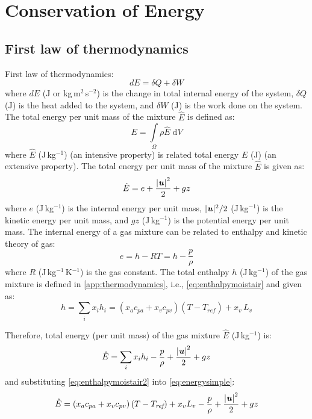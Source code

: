 \newpage
\section{Conservation of Energy}
\label{sec:conservationofenergy}

\subsection{First law of thermodynamics}

First law of thermodynamics:
\begin{equation}
dE = \delta Q + \delta W
\end{equation}
where $dE$ (J or kg\,m$^2$\,s$^{-2}$) is the change in total internal energy of the system, $\delta Q$ (J) is the heat added to the system, and $\delta W$ (J) is the work done on the system. The total energy per unit mass of the mixture $\hat{E}$ is defined as:
\begin{equation}
E = \int\limits_\Omega \rho \hat{E}\;\mathrm{d}V
\end{equation}
where $\hat{E}$ (J\,kg$^{-1}$) (an intensive property) is related total energy $E$ (J) (an extensive property). The total energy per unit mass of the mixture $\hat{E}$ is given as: 
\begin{equation}
\hat{E} = e + \frac{\left| \textbf{\textit{u}} \right|^2}{2} + gz
\end{equation}
where $e$ (J\,kg$^{-1}$) is the internal energy per unit mass, $|\textbf{\textit{u}}|^2/2$ (J\,kg$^{-1}$) is the kinetic energy per unit mass, and $gz$ (J\,kg$^{-1}$) is the potential energy per unit mass. The internal energy of a gas mixture can be related to enthalpy and kinetic theory of gas:
\begin{equation}
e = h - RT = h - \frac{p}{\rho}
\end{equation}
where $R$ (J\,kg$^{-1}$\,K$^{-1}$) is the gas constant. The total enthalpy $h$ (J\,kg$^{-1}$) of the gas mixture is defined in \cref{app:thermodynamics}, i.e., \cref{eq:enthalpymoistair} and given as:
 \begin{equation}
h = \sum_i x_i h_i =  \left(x_a c_{pa} + x_v c_{pv} \right) \left(T - T_{\textit{ref}}\right)  + x_v\,L_v 
\label{eq:enthalpymoistair2}
\end{equation}

Therefore, total energy (per unit mass) of the gas mixture $\hat{E}$ (J\,kg$^{-1}$) is:
\begin{equation}
\hat{E} = \sum_i x_i h_i - \frac{p}{\rho} + \frac{\left| \textbf{\textit{u}} \right|^2}{2} + gz
\label{eq:energysimple}
\end{equation}
and substituting \cref{eq:enthalpymoistair2} into \cref{eq:energysimple}:
\begin{equation}
\hat{E} = \left(x_a c_{pa} + x_v c_{pv} \right) \left(T - T_{\textit{ref}}\right)  + x_v L_v - \frac{p}{\rho} + \frac{\left| \textbf{\textit{u}} \right|^2}{2} + gz
\label{eq:energysimple2}
\end{equation}

